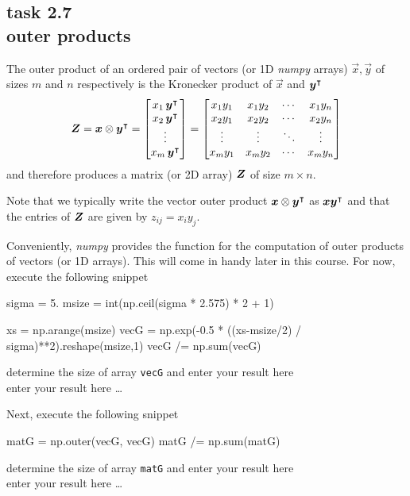 
\subsection*{task 2.7 \\[1ex] outer products}

The outer product of an ordered pair of vectors (or 1D \emph{numpy} arrays) $\vec{x}, \vec{y}$ of sizes $m$ and $n$  respectively is the Kronecker product of $\vec{x}$ and $\bm{y}^\intercal$
\begin{equation*}
\bm{Z} = \bm{x} \otimes \bm{y}^\intercal
=
\begin{bmatrix}
x_1 \, \bm{y}^\intercal \\
x_2 \, \bm{y}^\intercal \\
\vdots \\
x_m \, \bm{y}^\intercal
\end{bmatrix}
=
\begin{bmatrix}
x_1 y_1 & x_1 y_2 & \cdots & x_1 y_n \\
x_2 y_1 & x_2 y_2 & \cdots & x_2 y_n \\
\vdots & \vdots & \ddots & \vdots \\
x_m y_1 & x_m y_2 & \cdots & x_m y_n \\
\end{bmatrix}
\end{equation*}
and therefore produces a matrix (or 2D array) $\bm{Z}$ of size $m \times n$.

Note that we typically write the vector outer product $\bm{x} \otimes \bm{y}^\intercal$ as $\bm{x} \bm{y}^\intercal$ and that the entries of $\bm{Z}$ are given by $z_{ij} = x_i y_j$.

Conveniently, \emph{numpy} provides the function  for the computation of outer products of vectors (or 1D arrays). This will come in handy later in this course. For now, execute the following snippet
\begin{python}
sigma = 5.
msize = int(np.ceil(sigma * 2.575) * 2 + 1)

xs    = np.arange(msize)
vecG  = np.exp(-0.5 * ((xs-msize/2) / sigma)**2).reshape(msize,1)
vecG /= np.sum(vecG)
\end{python}
determine the size of array \texttt{vecG} and enter your result here
\color{blue} \\[1ex]
enter your result here \ldots
\color{black}



\vspace{1cm}
Next, execute the following snippet
\begin{python}
matG  = np.outer(vecG, vecG)
matG /= np.sum(matG)
\end{python}
determine the size of array \texttt{matG} and enter your result here
\color{blue} \\[1ex]
enter your result here \ldots
\color{black}



